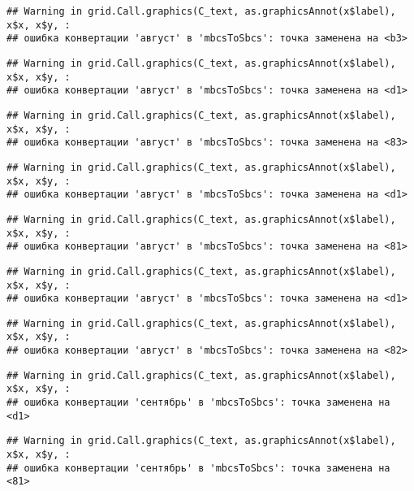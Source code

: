 \documentclass[
]{article}
\begin{document}
\begin{verbatim}
## Warning in grid.Call.graphics(C_text, as.graphicsAnnot(x$label), x$x, x$y, :
## ошибка конвертации 'август' в 'mbcsToSbcs': точка заменена на <b3>
\end{verbatim}

\begin{verbatim}
## Warning in grid.Call.graphics(C_text, as.graphicsAnnot(x$label), x$x, x$y, :
## ошибка конвертации 'август' в 'mbcsToSbcs': точка заменена на <d1>
\end{verbatim}

\begin{verbatim}
## Warning in grid.Call.graphics(C_text, as.graphicsAnnot(x$label), x$x, x$y, :
## ошибка конвертации 'август' в 'mbcsToSbcs': точка заменена на <83>
\end{verbatim}

\begin{verbatim}
## Warning in grid.Call.graphics(C_text, as.graphicsAnnot(x$label), x$x, x$y, :
## ошибка конвертации 'август' в 'mbcsToSbcs': точка заменена на <d1>
\end{verbatim}

\begin{verbatim}
## Warning in grid.Call.graphics(C_text, as.graphicsAnnot(x$label), x$x, x$y, :
## ошибка конвертации 'август' в 'mbcsToSbcs': точка заменена на <81>
\end{verbatim}

\begin{verbatim}
## Warning in grid.Call.graphics(C_text, as.graphicsAnnot(x$label), x$x, x$y, :
## ошибка конвертации 'август' в 'mbcsToSbcs': точка заменена на <d1>
\end{verbatim}

\begin{verbatim}
## Warning in grid.Call.graphics(C_text, as.graphicsAnnot(x$label), x$x, x$y, :
## ошибка конвертации 'август' в 'mbcsToSbcs': точка заменена на <82>
\end{verbatim}

\begin{verbatim}
## Warning in grid.Call.graphics(C_text, as.graphicsAnnot(x$label), x$x, x$y, :
## ошибка конвертации 'сентябрь' в 'mbcsToSbcs': точка заменена на <d1>
\end{verbatim}

\begin{verbatim}
## Warning in grid.Call.graphics(C_text, as.graphicsAnnot(x$label), x$x, x$y, :
## ошибка конвертации 'сентябрь' в 'mbcsToSbcs': точка заменена на <81>
\end{verbatim}
\end{document}
